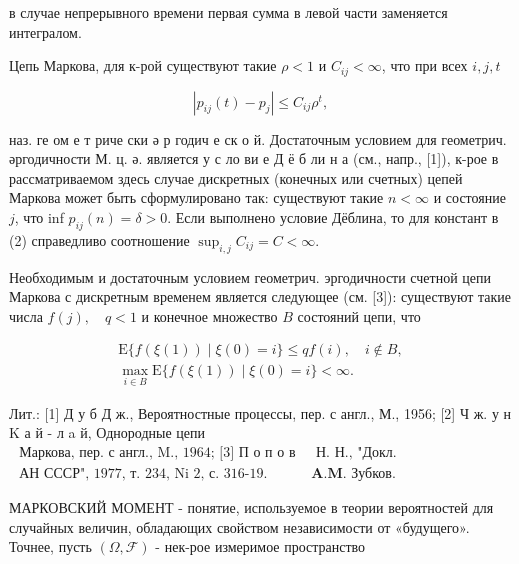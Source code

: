 \documentclass[10pt]{article}
\begin{document}
в случае непрерывного времени первая сумма в левой части заменяется интегралом.



Цепь Маркова, для к-рой существуют такие $\rho<1$ и $C_{i j}<\infty$, что при всех $i, j, t$



\[

\left|p_{i j}(t)-p_{j}\right| \leqslant C_{i j} \rho^{t},

\]



наз. ге ом е т риче ски ә р годич е ск о й. Достаточным условием для геометрич. әргодичности М. ц. ә. является у с ло ви е Д ё б ли н а (см., напр., [1]), к-рое в рассматриваемом здесь случае дискретных (конечных или счетных) цепей Маркова может быть сформулировано так: существуют такие $n<\infty$ и состояние $j$, что inf $p_{i j}(n)=\delta>0$. Если выполнено условие Дёблина, то для констант в (2) справедливо соотношение $\sup _{i, j} C_{i j}=C<\infty$.



Необходимым и достаточным условием геометрич. эргодичности счетной цепи Маркова с дискретным временем является следующее (см. [3]): существуют такие числа $f(j), \quad q<1$ и конечное множество $B$ состояний цепи, что



\[

\begin{gathered}

\mathrm{E}\{f(\xi(1)) \mid \xi(0)=i\} \leqslant q f(i), \quad i \notin B, \\

\max _{i \in B} \mathrm{E}\{f(\xi(1)) \mid \xi(0)=i\}<\infty .

\end{gathered}

\]



Лит.: [1] Д у б Д ж., Вероятностные процессы, пер. с англ., М., 1956; [2] Ч ж. у н $\mathrm{K}$ а й - л a й, Однородные цепи $\begin{array}{ll}\text { Маркова, пер. с англ., M., 1964; [3] П о п о в } & \text { Н. Н., "Докл. } \\ \text { АН СССР", 1977, т. } 234 \text {, Ni 2, с. 316-19. } & \boldsymbol{A} . \boldsymbol{M} . \text { Зубков. }\end{array}$



МАРКОВСКИЙ МОМЕНТ - понятие, используемое в теории вероятностей для случайных величин, обладающих свойством независимости от «будущего». Точнее, пусть $(\Omega, \mathscr{F})$ - нек-рое измеримое пространство
\end{document}
